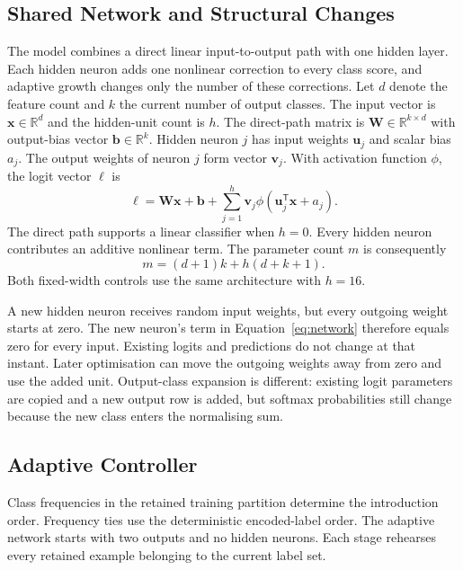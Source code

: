 \documentclass[conference,10pt]{IEEEtran}
\begin{document}
\subsection{Shared Network and Structural Changes}

The model combines a direct linear input-to-output path with one hidden layer. Each hidden neuron adds one nonlinear correction to every class score, and adaptive growth changes only the number of these corrections. Let $d$ denote the feature count and $k$ the current number of output classes. The input vector is $\mathbf{x}\in\mathbb{R}^{d}$ and the hidden-unit count is $h$. The direct-path matrix is $\mathbf{W}\in\mathbb{R}^{k\times d}$ with output-bias vector $\mathbf{b}\in\mathbb{R}^{k}$. Hidden neuron $j$ has input weights $\mathbf{u}_j$ and scalar bias $a_j$. The output weights of neuron $j$ form vector $\mathbf{v}_j$. With activation function $\phi$, the logit vector $\boldsymbol{\ell}$ is
\begin{equation}
\boldsymbol{\ell}=\mathbf{W}\mathbf{x}+\mathbf{b}
 +\sum_{j=1}^{h}\mathbf{v}_j\phi(\mathbf{u}_j^{\mathsf{T}}\mathbf{x}+a_j).
\label{eq:network}
\end{equation}
The direct path supports a linear classifier when $h=0$. Every hidden neuron contributes an additive nonlinear term. The parameter count $m$ is consequently
\begin{equation}
m=(d+1)k+h(d+k+1).
\label{eq:parameters}
\end{equation}
Both fixed-width controls use the same architecture with $h=16$.

A new hidden neuron receives random input weights, but every outgoing weight starts at zero. The new neuron's term in Equation~\ref{eq:network} therefore equals zero for every input. Existing logits and predictions do not change at that instant. Later optimisation can move the outgoing weights away from zero and use the added unit. Output-class expansion is different: existing logit parameters are copied and a new output row is added, but softmax probabilities still change because the new class enters the normalising sum.

\subsection{Adaptive Controller}

Class frequencies in the retained training partition determine the introduction order. Frequency ties use the deterministic encoded-label order. The adaptive network starts with two outputs and no hidden neurons. Each stage rehearses every retained example belonging to the current label set.
\end{document}
